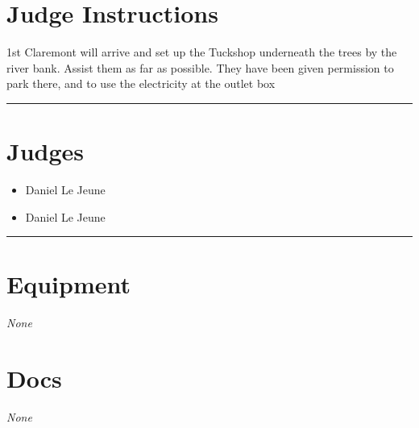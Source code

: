 \documentclass[10pt]{article}
\begin{document}
		\section*{Judge Instructions}
		1st Claremont will arrive and set up the Tuckshop underneath the trees by the river bank. Assist them as far as possible. They have been given permission to park there, and to use the electricity at the outlet box
\vspace{0.5cm}
	\hrule
	\vspace{0.5cm}
		\section*{\faUsers \: Judges}

		

	\begin{multicols}{2}

		\begin{itemize}
									\item Daniel Le Jeune
						\end{itemize}

		\vfill\null
		\columnbreak

		\begin{itemize}
									\item Daniel Le Jeune
						\end{itemize}

		\vfill\null

		\end{multicols}



			\vspace{0.5cm}
	\hrule
	\vspace{0.5cm}

	\begin{multicols}{2}

		\section*{\faWrench \: Equipment}

				\textit{None}
		
		\vfill\null
		\columnbreak

			\section*{\faFile \: Docs}
		 	\textit{None}
	

		\vfill\null

		\end{multicols}
\end{document}
